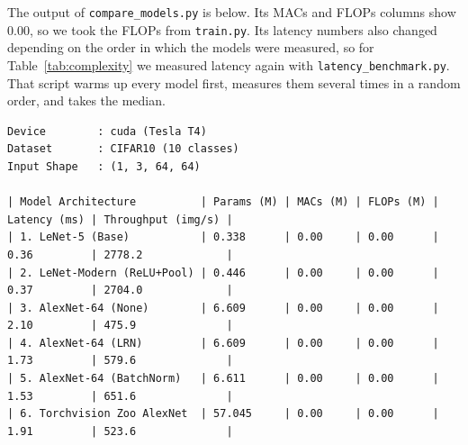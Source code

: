 \documentclass[12pt]{article}
\begin{document}
\begin{table}[H]
\centering
\caption{Size and cost of the models. FLOPs come from the profiler that \texttt{train.py} prints at the start of each
run. Latency is the median time for one image (batch size 1) on the T4. Epoch time is the average per epoch, on the
CPU for the LeNets and on the T4 for the AlexNets. Row 6 is the same network as row 5, since augmentation is only
used during training.}
\label{tab:complexity}
\end{table}

The output of \texttt{compare\_models.py} is below. Its MACs and FLOPs columns show
0.00, so we took the FLOPs from \texttt{train.py}. Its latency numbers also changed depending on the order in which
the models were measured, so for Table~\ref{tab:complexity} we measured latency again with
\texttt{latency\_benchmark.py}. That script warms up every model first, measures them several times in a random
order, and takes the median.

\begin{lstlisting}[numbers=none,basicstyle=\ttfamily\scriptsize]
Device        : cuda (Tesla T4)
Dataset       : CIFAR10 (10 classes)
Input Shape   : (1, 3, 64, 64)

| Model Architecture          | Params (M) | MACs (M) | FLOPs (M) | Latency (ms) | Throughput (img/s) |
| 1. LeNet-5 (Base)           | 0.338      | 0.00     | 0.00      | 0.36         | 2778.2             |
| 2. LeNet-Modern (ReLU+Pool) | 0.446      | 0.00     | 0.00      | 0.37         | 2704.0             |
| 3. AlexNet-64 (None)        | 6.609      | 0.00     | 0.00      | 2.10         | 475.9              |
| 4. AlexNet-64 (LRN)         | 6.609      | 0.00     | 0.00      | 1.73         | 579.6              |
| 5. AlexNet-64 (BatchNorm)   | 6.611      | 0.00     | 0.00      | 1.53         | 651.6              |
| 6. Torchvision Zoo AlexNet  | 57.045     | 0.00     | 0.00      | 1.91         | 523.6              |
\end{lstlisting}
\end{document}
